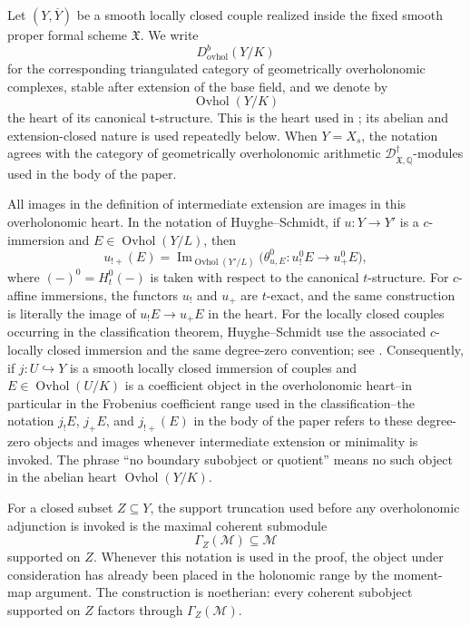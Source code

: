 \documentclass[11pt]{amsart}
\theoremstyle{plain}
\theoremstyle{definition}
\theoremstyle{remark}
\newcommand{\Ovhol}{\operatorname{Ovhol}}
\begin{document}
Let \((Y,\overline Y)\) be a smooth locally closed couple realized inside the
fixed smooth proper formal scheme \(\mathfrak X\).  We write
\[
  D^b_{\mathrm{ovhol}}(Y/K)
\]
for the corresponding triangulated category of geometrically overholonomic
complexes, stable after extension of the base field, and we denote by
\[
  \Ovhol(Y/K)
\]
the heart of its canonical t-structure.  This is the heart used in
\cite[\S2.1, first paragraphs]{HuygheSchmidtIntermediate}; its abelian and
extension-closed nature is used repeatedly below.  When \(Y=X_s\), the notation
agrees with the category of geometrically overholonomic arithmetic
\(\mathscr D^\dagger_{\mathfrak X,\mathbb Q}\)-modules used in the body of the
paper.

All images in the definition of intermediate extension are images in this
overholonomic heart.  In the notation of Huyghe--Schmidt, if \(u:Y\to Y'\) is a
\(c\)-immersion and \(E\in\Ovhol(Y/L)\), then
\[
  u_{!+}(E)=\operatorname{Im}_{\Ovhol(Y'/L)}
  \bigl(\theta^0_{u,E}:u^0_!E\longrightarrow u^0_+E\bigr),
\]
where \((- )^0=H^0_t(-)\) is taken with respect to the canonical
\(t\)-structure.  For \(c\)-affine immersions, the functors \(u_!\) and
\(u_+\) are \(t\)-exact, and the same construction is literally the image of
\(u_!E\to u_+E\) in the heart.  For the locally closed couples occurring in the
classification theorem, Huyghe--Schmidt use the associated \(c\)-locally closed
immersion and the same degree-zero convention; see
\cite[\S2.2, definition of \(u_{!+}\), and \S2.3]{HuygheSchmidtIntermediate}.  Consequently, if
\(j:U\hookrightarrow Y\) is a smooth locally closed immersion of couples and
\(E\in\Ovhol(U/K)\) is a coefficient object in the overholonomic heart--in
particular in the Frobenius coefficient range used in the classification--the
notation \(j_!E\), \(j_+E\), and \(j_{!+}(E)\) in the body of the paper refers
to these degree-zero objects and images whenever intermediate extension or
minimality is invoked.  The phrase
``no boundary subobject or quotient'' means no such object in the abelian heart
\(\Ovhol(Y/K)\).

For a closed subset \(Z\subseteq Y\), the support truncation used before any
overholonomic adjunction is invoked is the maximal coherent submodule
\[
  \Gamma_Z(\mathcal M)\subseteq \mathcal M
\]
supported on \(Z\).  Whenever this notation is used in the proof, the object
under consideration has already been placed in the holonomic range by the
moment-map argument.  The construction is noetherian: every coherent subobject
supported on \(Z\) factors through \(\Gamma_Z(\mathcal M)\).
\end{document}
